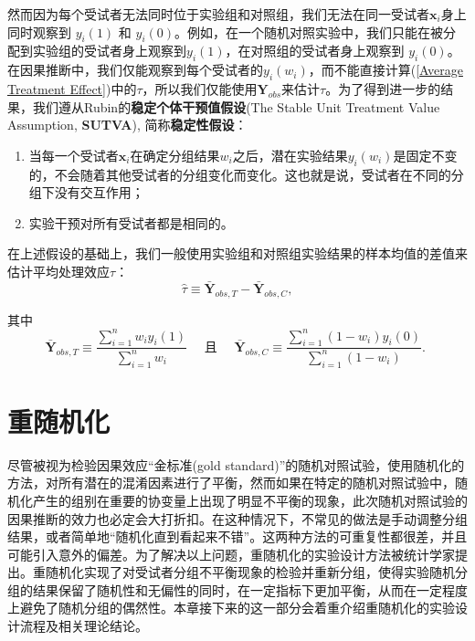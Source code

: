 然而因为每个受试者无法同时位于实验组和对照组，我们无法在同一受试者$\mathbf{x}_i$身上同时观察到
$y_i(1)$ 和 $y_i(0)$。例如，在一个随机对照实验中，我们只能在被分配到实验组的受试者身上观察到$y_i(1)$，在对照组的受试者身上观察到
$y_i(0)$。在因果推断中，我们仅能观察到每个受试者的$y_i(w_i)$，而不能直接计算(\ref{Average Treatment Effect})中的$\tau$，所以我们仅能使用$\mathbf{Y}_{obs}$来估计$\tau$。为了得到进一步的结果，我们遵从Rubin的\textbf{稳定个体干预值假设}(The Stable Unit Treatment Value Assumption, \textbf{SUTVA})\cite{rubin1980randomization}, 简称\textbf{稳定性假设}：
\begin{enumerate}
    \item 当每一个受试者$\mathbf{x}_i$在确定分组结果$w_i$之后，潜在实验结果$y_i(w_i)$是固定不变的，不会随着其他受试者的分组变化而变化。这也就是说，受试者在不同的分组下没有交互作用；
    \item 实验干预对所有受试者都是相同的。
\end{enumerate}

在上述假设的基础上，我们一般使用实验组和对照组实验结果的样本均值的差值来估计平均处理效应$\tau$：
\begin{equation}\label{equ:ATE's ets}
    \hat{\tau} \equiv \bar{\mathbf{Y}}_{o b s, T}-\bar{\mathbf{Y}}_{o b s, C},
\end{equation}

其中
$$
\bar{\mathbf{Y}}_{o b s, T} \equiv \frac{\sum _{i=1}^n w_i y_i(1)}{\sum _{i=1}^n w_i} \quad \text { 且 } \quad \bar{\mathbf{Y}}_{o b s, C} \equiv \frac{\sum _{i=1}^n\left(1-w_i\right) y_i(0)}{\sum _{i=1}^n\left(1-w_i\right)} \text {. }
$$


\section{重随机化}

尽管被视为检验因果效应“金标准(gold standard)”的随机对照试验，使用随机化的方法，对所有潜在的混淆因素进行了平衡，然而如果在特定的随机对照试验中，随机化产生的组别在重要的协变量上出现了明显不平衡的现象，此次随机对照试验的因果推断的效力也必定会大打折扣。在这种情况下，不常见的做法是手动调整分组结果，或者简单地“随机化直到看起来不错”。这两种方法的可重复性都很差，并且可能引入意外的偏差。为了解决以上问题，重随机化的实验设计方法被统计学家提出。重随机化实现了对受试者分组不平衡现象的检验并重新分组，使得实验随机分组的结果保留了随机性和无偏性的同时，在一定指标下更加平衡，从而在一定程度上避免了随机分组的偶然性。本章接下来的这一部分会着重介绍重随机化的实验设计流程及相关理论结论。

